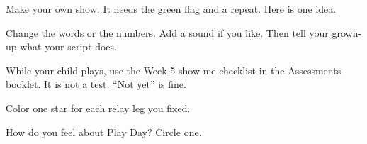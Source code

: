 \begin{exercise}
Make your own show. It needs the green flag and a repeat. Here is one idea.
\begin{center}
\begin{scratch}[scale=0.85]
\end{scratch}
\end{center}
Change the words or the numbers. Add a sound if you like. Then tell your grown-up what your script does.
\end{exercise}

\begin{grownup}[Show me]
While your child plays, use the Week 5 show-me checklist in the Assessments booklet. It is not a test. \enquote{Not yet} is fine.
\end{grownup}

\begin{vocab}
\end{vocab}

\begin{reflection}
Color one star for each relay leg you fixed.

\begin{center}
\Huge\faStar[regular]\qquad\faStar[regular]\qquad\faStar[regular]
\end{center}

How do you feel about Play Day? Circle one.

\begin{center}
\Huge\faSmile[regular]\qquad\faMeh[regular]\qquad\faFrown[regular]
\end{center}
\end{reflection}
